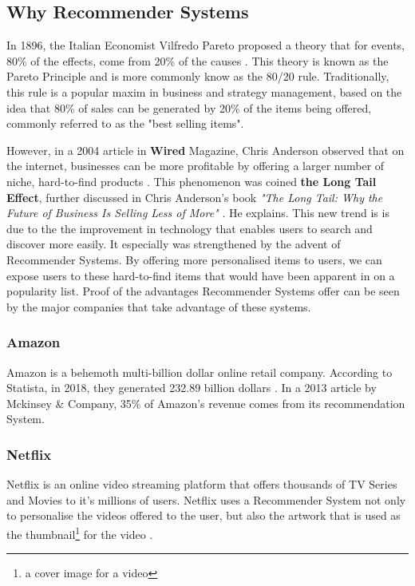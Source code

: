 \subsection{Why Recommender Systems} \label{subsec:WhyRecSystems}
In 1896, the Italian Economist Vilfredo Pareto proposed a theory that for events, 80\% of the effects, come from 20\% of the causes \cite{sanders1987pareto}. This theory is known as the Pareto Principle and is more commonly know as the 80/20 rule. Traditionally, this rule is a popular maxim in business and strategy management, based on the idea that 80\% of sales can be generated by 20\% of the items being offered, commonly referred to as the "best selling items".

However, in a 2004 article in \textbf{Wired} Magazine, Chris Anderson observed that on the internet, businesses can be more profitable by offering a larger number of niche, hard-to-find products \cite{brynjolfsson2011goodbye}. This phenomenon was coined \textbf{the Long Tail Effect}, further discussed in Chris Anderson's book \textit{"The Long Tail: Why the Future of Business Is Selling Less of More"} \cite{anderson2006long}. He explains. This new trend is is due to the the improvement in technology that enables users to search and discover more easily. It especially was strengthened by the advent of Recommender Systems. By offering more personalised items to users, we can expose users to these hard-to-find items that would have been apparent in on a popularity list. Proof of the advantages Recommender Systems offer can be seen by the major companies that take advantage of these systems.


\subsubsection{Amazon} 
Amazon is a behemoth multi-billion dollar online retail company. According to Statista, in 2018, they generated 232.89 billion dollars \cite{statista}. In a 2013 article by Mckinsey \& Company, 35\% of Amazon's revenue comes from its recommendation System. 

\subsubsection{Netflix}
Netflix is an online video streaming platform that offers thousands of TV Series and Movies to it's millions of users. Netflix uses a Recommender System not only to personalise the videos offered to the user, but also the artwork that is used as the thumbnail\footnote{a cover image for a video} for the video \cite{josefina2018netflix}.

